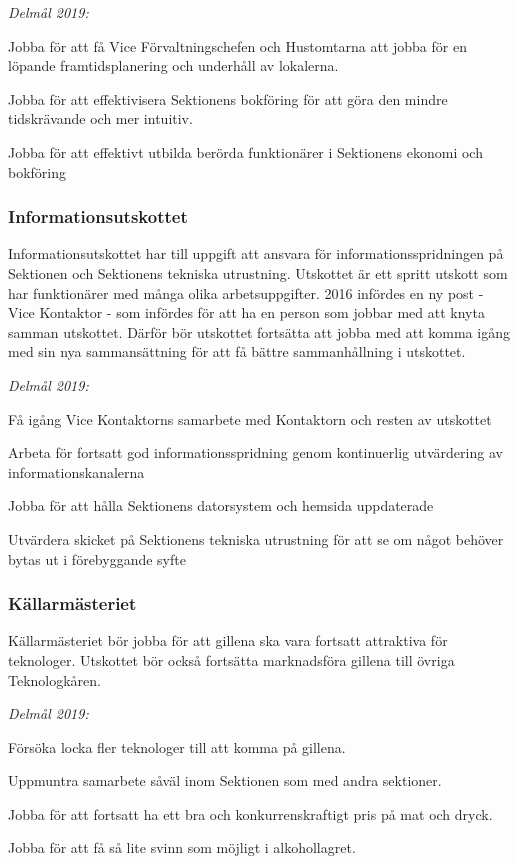 \documentclass[../_main/handlingar.tex]{subfiles}
\begin{document}
\emph{Delmål 2019:}
\begin{dashlist}
    \item Jobba för att få Vice Förvaltningschefen och Hustomtarna att jobba för en löpande framtidsplanering och underhåll av lokalerna. 
    \item Jobba för att effektivisera Sektionens bokföring för att göra den mindre tidskrävande och mer intuitiv. 
    \item Jobba för att effektivt utbilda berörda funktionärer i Sektionens ekonomi och bokföring
\end{dashlist}

\newpage

\subsubsection*{Informationsutskottet}
Informationsutskottet har till uppgift att ansvara för informationsspridningen på Sektionen och Sektionens tekniska utrustning. Utskottet är ett spritt utskott som har funktionärer med många olika arbetsuppgifter. 2016 infördes en ny post - Vice Kontaktor - som infördes för att ha en person som jobbar med att knyta samman utskottet. Därför bör utskottet fortsätta att jobba med att komma igång med sin nya sammansättning för att få bättre sammanhållning i utskottet.

\emph{Delmål 2019:}
\begin{dashlist}
    \item Få igång Vice Kontaktorns samarbete med Kontaktorn och resten av utskottet
    \item Arbeta för fortsatt god informationsspridning genom kontinuerlig utvärdering av informationskanalerna
    \item Jobba för att hålla Sektionens datorsystem och hemsida uppdaterade
    \item Utvärdera skicket på Sektionens tekniska utrustning för att se om något behöver bytas ut i förebyggande syfte
\end{dashlist}

\subsubsection*{Källarmästeriet}
Källarmästeriet bör jobba för att gillena ska vara fortsatt attraktiva för teknologer. Utskottet bör också fortsätta marknadsföra gillena till övriga Teknologkåren. 

\emph{Delmål 2019:}
\begin{dashlist}
    \item Försöka locka fler teknologer till att komma på gillena. 
    \item Uppmuntra samarbete såväl inom Sektionen som med andra sektioner. 
    \item Jobba för att fortsatt ha ett bra och konkurrenskraftigt pris på mat och dryck. 
    \item Jobba för att få så lite svinn som möjligt i alkohollagret.     
\end{dashlist}
\end{document}
